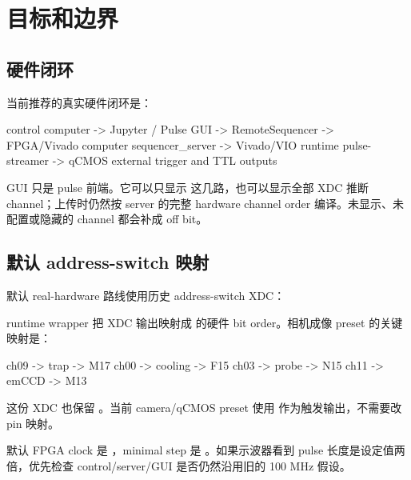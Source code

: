\documentclass[11pt,oneside,openany]{book}
\begin{document}
\frontmatter
{}
\tableofcontents
\cleardoublepage
\mainmatter

\chapter{目标和边界}
\section{硬件闭环}
 当前推荐的真实硬件闭环是：

\begin{codeblock}
control computer
  -> Jupyter / Pulse GUI
  -> RemoteSequencer
  -> FPGA/Vivado computer sequencer_server
  -> Vivado/VIO runtime pulse-streamer
  -> qCMOS external trigger and TTL outputs
\end{codeblock}

GUI 只是 pulse 前端。它可以只显示  这几路，也可以显示全部 XDC 推断 channel；上传时仍然按 server 的完整 hardware channel order 编译。未显示、未配置或隐藏的 channel 都会补成 off bit。

\section{默认 address-switch 映射}
默认 real-hardware 路线使用历史 address-switch XDC：


runtime wrapper 把 XDC 输出映射成  的硬件 bit order。相机成像 preset 的关键映射是：

\begin{codeblock}
ch09 -> trap    -> M17
ch00 -> cooling -> F15
ch03 -> probe   -> N15
ch11 -> emCCD   -> M13
\end{codeblock}

这份 XDC 也保留 。当前 camera/qCMOS preset 使用  作为触发输出，不需要改 pin 映射。

默认 FPGA clock 是 ，minimal step 是 。如果示波器看到 pulse 长度是设定值两倍，优先检查 control/server/GUI 是否仍然沿用旧的 100 MHz 假设。
\end{document}
